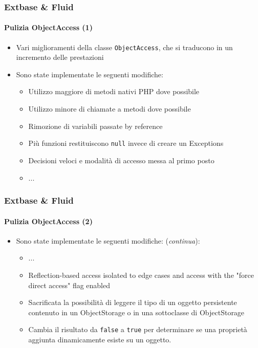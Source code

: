 \begin{frame}[fragile]
	\frametitle{Extbase \& Fluid}
	\framesubtitle{Pulizia ObjectAccess (1)}

	\begin{itemize}

		\item Vari miglioramenti della classe \texttt{ObjectAccess}, che si traducono in un incremento delle prestazioni
		\item Sono state implementate le seguenti modifiche:

			\begin{itemize}
				\item Utilizzo maggiore di metodi nativi PHP dove possibile
				\item Utilizzo minore di chiamate a metodi dove possibile
				\item Rimozione di variabili passate by reference
				\item Più funzioni restituiscono \texttt{null} invece di creare un Exceptions
				\item Decisioni veloci e modalità di accesso messa al primo posto
				\item ...
			\end{itemize}

	\end{itemize}

\end{frame}


\begin{frame}[fragile]
	\frametitle{Extbase \& Fluid}
	\framesubtitle{Pulizia ObjectAccess (2)}

	\begin{itemize}

		\item Sono state implementate le seguenti modifiche: (\textit{continua}):

			\begin{itemize}
				\item ...
				\item Reflection-based access isolated to edge cases and access with the "force direct access" flag enabled
				\item Sacrificata la possibilità di leggere il tipo di un oggetto persistente contenuto in un ObjectStorage o in una sottoclasse di ObjectStorage
				\item Cambia il risultato da \texttt{false} a \texttt{true} per determinare se una proprietà aggiunta dinamicamente esiste su un oggetto.
			\end{itemize}

	\end{itemize}

\end{frame}

